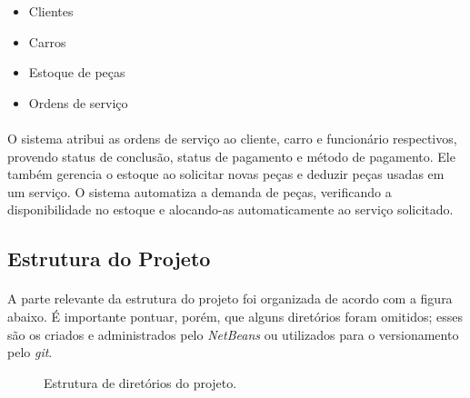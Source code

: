\documentclass[a4paper,12pt]{article}
\begin{document}
\begin{itemize}[noitemsep]
    \item Clientes
    \item Carros
    \item Estoque de peças
    \item Ordens de serviço
\end{itemize}

\paragraph{}
O sistema atribui as ordens de serviço ao cliente, carro e funcionário respectivos, provendo status de conclusão, status de pagamento e método de pagamento. Ele também gerencia o estoque ao solicitar novas peças e deduzir peças usadas em um serviço. O sistema automatiza a demanda de peças, verificando a disponibilidade no estoque e alocando-as automaticamente ao serviço solicitado.


\subsection{Estrutura do Projeto}
\paragraph{}
A parte relevante da estrutura do projeto foi organizada de acordo com a figura abaixo. É importante pontuar, porém, que alguns diretórios foram omitidos; esses são os criados e administrados pelo \textit{NetBeans} ou utilizados para o versionamento pelo \textit{git}.

\begin{figure}[ht]
    \centering
    \begin{mdframed}[
        linewidth=0pt, %
        roundcorner=10pt, %
        backgroundcolor=cinza_claro, %
        innertopmargin=10pt, %
        innerbottommargin=10pt,
        innerleftmargin=20pt,
        innerrightmargin=20pt
    ]
    \end{mdframed}
    \caption{Estrutura de diretórios do projeto.}
    \label{fig:estrutura}
\end{figure}
    
\end{document}
